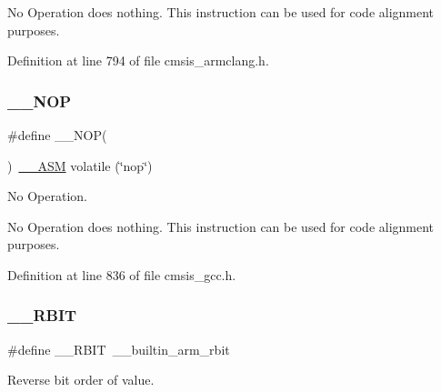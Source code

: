 No Operation does nothing. This instruction can be used for code alignment purposes. 

Definition at line 794 of file cmsis\+\_\+armclang.\+h.

\mbox{\label{group___c_m_s_i_s___core___instruction_interface_ga0b13f3617dd4af2cd2eb3a311073f717}} 
\subsubsection{\texorpdfstring{\+\_\+\+\_\+\+N\+OP}{\_\_NOP}\hspace{0.1cm}{\footnotesize\ttfamily [3/3]}}
{\footnotesize\ttfamily \#define \+\_\+\+\_\+\+N\+OP(\begin{DoxyParamCaption}{ }\end{DoxyParamCaption})~\hyperlink{cmsis__iccarm_8h_a1378040bcf22428955c6e3ce9c2053cd}{\+\_\+\+\_\+\+A\+SM} volatile (\char`\"{}nop\char`\"{})}



No Operation. 

No Operation does nothing. This instruction can be used for code alignment purposes. 

Definition at line 836 of file cmsis\+\_\+gcc.\+h.

\mbox{\label{group___c_m_s_i_s___core___instruction_interface_gab83768933a612816fad669db5488366f}} 
\subsubsection{\texorpdfstring{\+\_\+\+\_\+\+R\+B\+IT}{\_\_RBIT}}
{\footnotesize\ttfamily \#define \+\_\+\+\_\+\+R\+B\+IT~\+\_\+\+\_\+builtin\+\_\+arm\+\_\+rbit}



Reverse bit order of value. 

